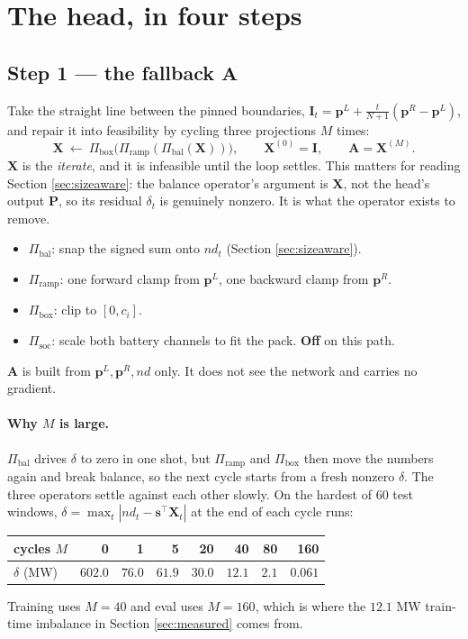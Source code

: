 \documentclass[11pt]{article}
\begin{document}
\section{The head, in four steps}

\subsection*{Step 1 --- the fallback $\mathbf{A}$}

Take the straight line between the pinned boundaries,
$\mathbf{I}_t=\mathbf{p}^{L}+\tfrac{t}{N+1}(\mathbf{p}^{R}-\mathbf{p}^{L})$, and
repair it into feasibility by cycling three projections $M$ times:
\begin{equation}
\mathbf{X}\ \leftarrow\ \Pi_{\mathrm{box}}\bigl(\Pi_{\mathrm{ramp}}(\Pi_{\mathrm{bal}}(\mathbf{X}))\bigr),
\qquad \mathbf{X}^{(0)}=\mathbf{I},
\qquad \mathbf{A}=\mathbf{X}^{(M)} .
\end{equation}
$\mathbf{X}$ is the \emph{iterate}, and it is infeasible until the loop settles.
This matters for reading Section \ref{sec:sizeaware}: the balance operator's
argument is $\mathbf{X}$, not the head's output $\mathbf{P}$, so its residual
$\delta_t$ is genuinely nonzero. It is what the operator exists to remove.
\begin{itemize}
\item $\Pi_{\mathrm{bal}}$: snap the signed sum onto $nd_t$ (Section \ref{sec:sizeaware}).
\item $\Pi_{\mathrm{ramp}}$: one forward clamp from $\mathbf{p}^{L}$, one backward clamp from $\mathbf{p}^{R}$.
\item $\Pi_{\mathrm{box}}$: clip to $[0,c_i]$.
\item $\Pi_{\mathrm{soc}}$: scale both battery channels to fit the pack. \textbf{Off} on this path.
\end{itemize}
$\mathbf{A}$ is built from $\mathbf{p}^{L},\mathbf{p}^{R},nd$ only. It does not
see the network and carries no gradient.

\paragraph{Why $M$ is large.} $\Pi_{\mathrm{bal}}$ drives $\delta$ to zero in one
shot, but $\Pi_{\mathrm{ramp}}$ and $\Pi_{\mathrm{box}}$ then move the numbers
again and break balance, so the next cycle starts from a fresh nonzero
$\delta$. The three operators settle against each other slowly. On the hardest
of 60 test windows, $\delta=\max_t|nd_t-\mathbf{s}^{\!\top}\mathbf{X}_t|$ at the
end of each cycle runs:
\begin{center}
\begin{tabular}{lrrrrrrr}
\toprule
cycles $M$ & 0 & 1 & 5 & 20 & 40 & 80 & 160 \\
\midrule
$\delta$ (MW) & $602.0$ & $76.0$ & $61.9$ & $30.0$ & $12.1$ & $2.1$ & $0.061$ \\
\bottomrule
\end{tabular}
\end{center}
Training uses $M=40$ and eval uses $M=160$, which is where the $12.1$ MW
train-time imbalance in Section \ref{sec:measured} comes from.
\end{document}

